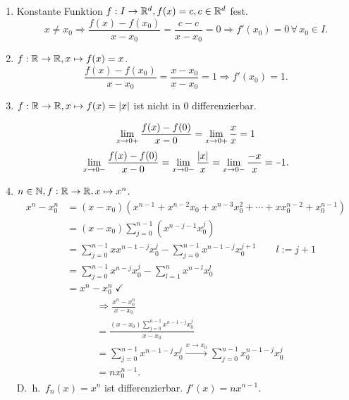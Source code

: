 \documentclass[../ana1.tex]{subfiles}
\begin{document}
\begin{bspe}\leavevmode
    \begin{enumerate}
        \item 
        Konstante Funktion \( f : I \rightarrow \mathbb{R}^d, f(x) = c, 
        c \in \mathbb{R}^d \) fest.
        \[ x \neq x_0 \Rightarrow \frac{f(x) - f(x_0)}{x-x_0} 
        = \frac{c - c}{x - x_0} = 0 \Rightarrow f'(x_0) = 0 
        \,\forall \, x_0 \in I. \]
        \item 
        \( f: \mathbb{R} \rightarrow \mathbb{R}, x \mapsto f(x) = x \). \\
        \[ \frac{f(x) - f(x_0)}{ x-x_0 } 
        = \frac{x - x_0}{x - x_0} = 1 \Rightarrow f'(x_0) = 1. \]
        \item 
        \( f : \mathbb{R} \rightarrow \mathbb{R}, x \mapsto f(x) = \left|x\right| \)
        ist nicht in \(0\) differenzierbar. 
        \begin{center}
        \end{center}
        \[ \lim\limits_{x\rightarrow 0+} \frac{f(x) - f(0)}{x - 0} 
        = \lim\limits_{x\rightarrow 0+} \frac{x}{x} = 1 \]
        \[ \limesx{x}{0-} \frac{f(x) - f(0)}{x - 0} 
        = \limesx{x}{0-} \frac{\abs{x}}{x} 
        = \limesx{x}{0-} \frac{-x}{x} = \minus 1. \]
        \item 
        \( n\in\mathbb{N}, f: \mathbb{R} \rightarrow \mathbb{R}, x \mapsto x^n \).
        \begin{align*}
            x^n - x_0^n &= (x-x_0)( x^{n-1} + x^{n-2}x_0 
            + x^{n-3}x_0^2 + \cdots + x x_0^{n-2} + x_0^{n-1} )\\
            &= (x - x_0) \sum_{j=0}^{n-1} (x^{n-j-1} x_0^j) \\
            &= \sum_{j=0}^{n-1} x x^{n-1-j} x_0^j 
            - \sum_{j=0}^{n-1} x^{n-1-j} x_0^{j+1} \qquad l := j+1\\
            &= \sum_{j=0}^{n-1} x^{n-j} x_0^j - \sum_{l=1}^n x^{n-l} x_0^l \\
            &= x^n - x_0^n \; \checkmark
        \end{align*}
        \begin{align*}
            &\Rightarrow \frac{x^n - x_0^n}{ x - x_0 } \\
            &= \frac{ (x - x_0) \sum_{j=0}^{n-1} x^{n-1-j}x_0^j }{x-x_0} \\
            &= \sum_{j=0}^{n-1} x^{n-1-j} x_0^j \overset{
                x \rightarrow x_0}{\longrightarrow
            } \sum_{j=0} ^{n-1} x_0^{n-1-j} x_0^j \\
            &= n x_0^{n-1}.
        \end{align*}
        D.\ h.\  \( f_n(x) = x^n \) ist differenzierbar. 
        \( f'(x) = n x^{n-1} \).
    \end{enumerate}
\end{bspe}
\end{document}

